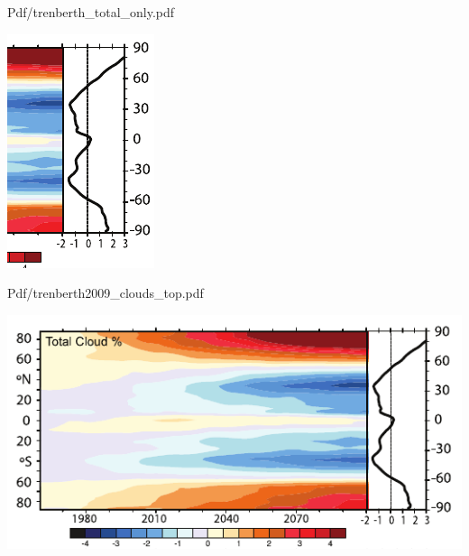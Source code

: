 \documentclass[presentation]{beamer}
\begin{document}
\begin{frame}[label={sec:org8e17e92}]{Pdf/trenberth\_total\_only.pdf}
\begin{center}
\includegraphics[width=0.7\linewidth]{./Figs/Pdf/trenberth_total_only.pdf}
\end{center}
\end{frame}

\begin{frame}[label={sec:org036e889}]{Pdf/trenberth2009\_clouds\_top.pdf}
\begin{center}
\includegraphics[width=0.7\linewidth]{./Figs/Pdf/trenberth2009_clouds_top.pdf}
\end{center}
\end{frame}
\end{document}
